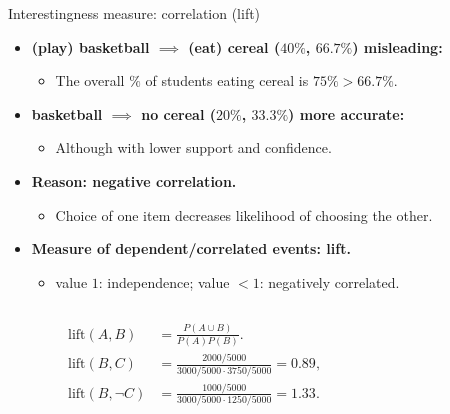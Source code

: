 \documentclass[aspectratio=169,t,xcolor=dvipsnames]{beamer}
\begin{document}
  {
    \begin{frame}{Interestingness measure: correlation (lift)}
        \begin{itemize}
          \item \textbf{(play) basketball $\implies$ (eat) cereal ($40\%$, $66.7\%$)  misleading:}
          \begin{itemize}
            \item The overall $\%$ of students eating cereal is $75\% > 66.7\%$.
          \end{itemize}
          \item \textbf{basketball $\implies$ no cereal ($20\%$, $33.3\%$)  more accurate:}
          \begin{itemize}
            \item Although with lower support and confidence.
          \end{itemize}
          \item \textbf{Reason: negative correlation.}
          \begin{itemize}
            \item Choice of one item decreases likelihood of choosing the other.
          \end{itemize}
          \item \textbf{Measure of dependent/correlated events: lift.}
          \begin{itemize}
            \item value $1$: independence; value $< 1$: negatively correlated.
          \end{itemize}
        \end{itemize}
      \begin{columns}
        \begin{column}{0.6\textwidth}
          \vspace{-1cm}
          \begin{align}
            \text{lift}(A,B) &= \frac{P(A \cup B)}{P(A) P(B)}.\\
            \text{lift}(B,C) &= \frac{2000/5000}{3000/5000 \cdot 3750 / 5000} = 0.89,\\
            \text{lift}(B,\neg C) &= \frac{1000 / 5000}{3000 / 5000 \cdot 1250 / 5000} =1.33.
          \end{align}
        \end{column}
          \begin{column}{0.3\textwidth}
        \end{column}
      \end{columns}
    \end{frame}
  }
\end{document}
